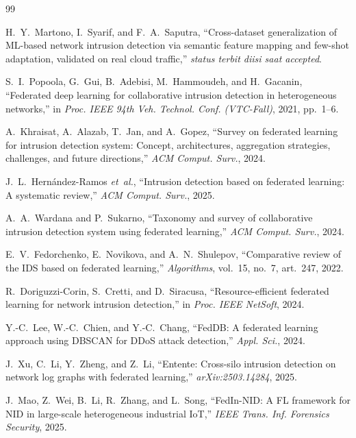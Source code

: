 \documentclass[11pt,a4paper]{article}
\begin{document}
\begin{thebibliography}{99}

 H.~Y.~Martono, I.~Syarif, and F.~A.~Saputra, ``Cross-dataset
generalization of ML-based network intrusion detection via semantic feature
mapping and few-shot adaptation, validated on real cloud traffic,'' \emph{status
terbit diisi saat accepted}.

 S.~I.~Popoola, G.~Gui, B.~Adebisi, M.~Hammoudeh, and
H.~Gacanin, ``Federated deep learning for collaborative intrusion detection in
heterogeneous networks,'' in \emph{Proc. IEEE 94th Veh. Technol. Conf.
(VTC-Fall)}, 2021, pp.~1--6.

 A.~Khraisat, A.~Alazab, T.~Jan, and A.~Gopez, ``Survey on
federated learning for intrusion detection system: Concept, architectures,
aggregation strategies, challenges, and future directions,'' \emph{ACM Comput.
Surv.}, 2024.

 J.~L.~Hern\'andez-Ramos \emph{et~al.}, ``Intrusion detection
based on federated learning: A systematic review,'' \emph{ACM Comput. Surv.},
2025.

 A.~A.~Wardana and P.~Sukarno, ``Taxonomy and survey of
collaborative intrusion detection system using federated learning,'' \emph{ACM
Comput. Surv.}, 2024.

 E.~V.~Fedorchenko, E.~Novikova, and A.~N.~Shulepov, ``Comparative
review of the IDS based on federated learning,'' \emph{Algorithms}, vol.~15,
no.~7, art.~247, 2022.

 R.~Doriguzzi-Corin, S.~Cretti, and D.~Siracusa,
``Resource-efficient federated learning for network intrusion detection,'' in
\emph{Proc. IEEE NetSoft}, 2024.

 Y.-C.~Lee, W.-C.~Chien, and Y.-C.~Chang, ``FedDB: A federated
learning approach using DBSCAN for DDoS attack detection,'' \emph{Appl. Sci.},
2024.

 J.~Xu, C.~Li, Y.~Zheng, and Z.~Li, ``Entente: Cross-silo
intrusion detection on network log graphs with federated learning,''
\emph{arXiv:2503.14284}, 2025.

 J.~Mao, Z.~Wei, B.~Li, R.~Zhang, and L.~Song, ``FedIn-NID: A FL
framework for NID in large-scale heterogeneous industrial IoT,'' \emph{IEEE Trans.
Inf. Forensics Security}, 2025.


\end{thebibliography}
\end{document}

